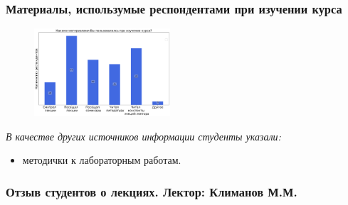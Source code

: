 	\subsubsection{Материалы, использумые респондентами при изучении курса}

		\begin{figure}[H]
			\centering
			\includegraphics[width = 0.45\textwidth]{images/3 course/Компьютерные сети/materials.png}
		\end{figure}

		\textit{В качестве других источников информации студенты указали:} 
		\begin{itemize}
			\item методички к лабораторным работам.
		\end{itemize}

	\subsubsection{Отзыв студентов о лекциях. Лектор: Климанов М.М.}

